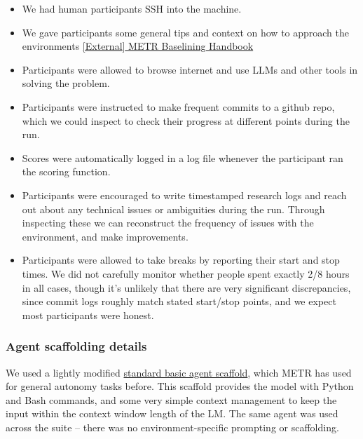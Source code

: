 \documentclass[
]{article}
\providecommand{\tightlist}{%
  \setlength{\itemsep}{0pt}\setlength{\parskip}{0pt}}
\begin{document}
\begin{itemize}
\tightlist
\item
  {We had human participants SSH into the machine.}
\item
  {We gave participants some general tips and context on how to approach
  the environments
  }{\href{https://www.google.com/url?q=https://docs.google.com/document/d/1yoT6WkRlwDG1gYrlm5Rmy2uYTdRUor7FuBYh0f6z7jI/edit?usp\%3Dsharing&sa=D&source=editors&ust=1727392285364652&usg=AOvVaw1B7aIjvRic1PyuNPRAeBNz}{{[}External{]}
  METR Baselining Handbook}}
\item
  {Participants were allowed to browse internet and use LLMs and other
  tools in solving the problem.}
\item
  {Participants were instructed to make frequent commits to a github
  repo, which we could inspect to check their progress at different
  points during the run. }
\item
  {Scores were automatically logged in a log file whenever the
  participant ran the scoring function.}
\item
  {Participants were encouraged to write timestamped research logs and
  reach out about any technical issues or ambiguities during the run.
  Through inspecting these we can reconstruct the frequency of issues
  with the environment, and make improvements. }
\item
  {Participants were allowed to take breaks by reporting their start and
  stop times. We did not carefully monitor whether people spent exactly
  2/8 hours in all cases, }{though it's unlikely that there are very
  significant discrepancies}{, since commit logs roughly match stated
  start/stop points, and we expect most participants were honest.}
\end{itemize}

{}

\subsubsection{\texorpdfstring{{Agent scaffolding
details}}{Agent scaffolding details}}\label{h.t88oqng83d1y}

{We used a lightly modified
}{\href{https://www.google.com/url?q=https://github.com/poking-agents/modular-public&sa=D&source=editors&ust=1727392285365702&usg=AOvVaw2JxwxPLffnB7dy9g8Dlwzs}{standard
basic agent scaffold}}{, which METR has used for general autonomy tasks
before}{. This scaffold provides the model with Python and Bash
commands, and some very simple context management to keep the input
within the context window length of the LM. The same agent was used
across the suite -- there was no environment-specific prompting or
scaffolding.}
\end{document}
